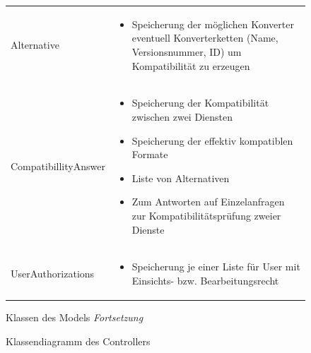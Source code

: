 \begin{figure}[h]
\begin{tabularx}{\textwidth}{p{} | X}
		Alternative & \compress \begin{itemize}
			\item Speicherung der möglichen Konverter eventuell Konverterketten (Name, Versionsnummer, ID) um Kompatibilität zu erzeugen
		\end{itemize}\\
		\rowcolor[HTML]{E7E7E7}
		CompatibillityAnswer & \compress \begin{itemize}
			\item Speicherung der Kompatibilität zwischen zwei Diensten
			\item Speicherung der effektiv kompatiblen Formate
			\item Liste von Alternativen
			\item Zum Antworten auf Einzelanfragen zur Kompatibilitätsprüfung zweier Dienste
		\end{itemize}\\
		UserAuthorizations & \compress \begin{itemize}
			\item Speicherung je einer Liste für User mit Einsichts- bzw. Bearbeitungsrecht
		\end{itemize}\\
	\end{tabularx}
	\caption{Klassen des Models \textit{Fortsetzung}}
\end{figure}



\begin{figure}[h]
	\centering
	\caption{Klassendiagramm des Controllers}
	\label{fig:klassendiagramm-a}
\end{figure}

